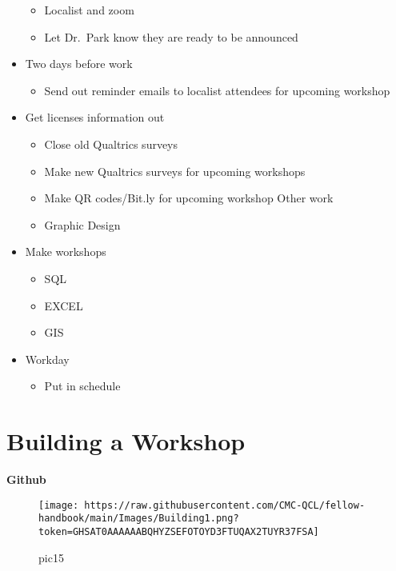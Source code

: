 \documentclass[
]{book}
\providecommand{\tightlist}{%
  \setlength{\itemsep}{0pt}\setlength{\parskip}{0pt}}
\begin{document}
\begin{itemize}
  \begin{itemize}
  \tightlist
  \item
    Localist and zoom
  \item
    Let Dr.~Park know they are ready to be announced
  \end{itemize}
\item
  Two days before work

  \begin{itemize}
  \tightlist
  \item
    Send out reminder emails to localist attendees for upcoming workshop
  \end{itemize}
\item
  Get licenses information out

  \begin{itemize}
  \tightlist
  \item
    Close old Qualtrics surveys
  \item
    Make new Qualtrics surveys for upcoming workshops
  \item
    Make QR codes/Bit.ly for upcoming workshop
    Other work
  \item
    Graphic Design
  \end{itemize}
\item
  Make workshops

  \begin{itemize}
  \tightlist
  \item
    SQL
  \item
    EXCEL
  \item
    GIS
  \end{itemize}
\item
  Workday

  \begin{itemize}
  \tightlist
  \item
    Put in schedule
  \end{itemize}
\end{itemize}

\hypertarget{building-a-workshop}{%
\section{Building a Workshop}\label{building-a-workshop}}

\textbf{Github}

\begin{figure}
\centering
\texttt{[image: https://raw.githubusercontent.com/CMC-QCL/fellow-handbook/main/Images/Building1.png?token=GHSAT0AAAAAABQHYZSEFOTOYD3FTUQAX2TUYR37FSA]}
\caption{pic15}
\end{figure}
\end{document}
